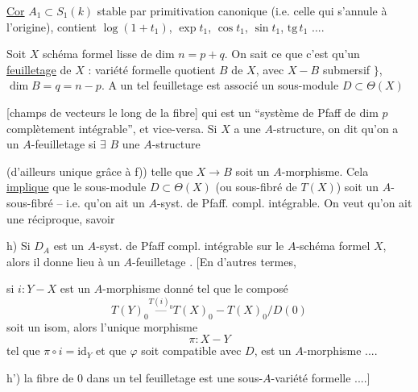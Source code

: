 \uline{Cor} $A_1\subset S_1(k)$ stable par primitivation canonique (i.e. celle qui s'annule à l'origine), contient $\log(1+t_1)$, $\exp t_1$, $\cos t_1$, $\sin t_1$, $\mathrm{tg}\,t_1$ ....

Soit $X$ schéma formel lisse de dim $n=p+q$. On sait  ce que c'est qu'un \uline{feuilletage}  de $X$ : variété formelle quotient $B$ de $X$, avec $X-B$ submersif $\}$, $\dim B=q=n-p$. A un tel feuilletage est associé un sous-module $D\subset\Theta(X)$

[champs de vecteurs le long de la fibre] qui est un ``système de Pfaff de dim $p$ complètement intégrable'', et vice-versa. Si $X$ a une $A$-structure, on dit qu'on a un $A$-feuilletage si $\exists$  $B$ une $A$-structure

(d'ailleurs unique \unsure{$\}$|)|,} grâce à f)) telle que $X\to B$ soit un $A$-morphisme. Cela \uline{implique} que le sous-module $D\subset\Theta(X)$ (ou sous-fibré de $T(X)$) soit un $A$-sous-fibré -- i.e. qu'on ait un $A$-syst. de Pfaff. compl. intégrable. On veut qu'on ait une réciproque, savoir

h) Si $D_A$ est un $A$-syst. de Pfaff compl. intégrable sur le $A$-schéma formel $X$, alors il donne lieu à un $A$-feuilletage . [En d'autres termes,


si $i:Y-X$ est un $A$-morphisme donné tel que le composé
\[
 T(Y)_0\mathrel{\overset{T(i)_0}{\text{---}}}T(X)_0-T(X)_0/D(0)
\]
soit un isom, alors l'unique morphisme
\[
 \pi:X-Y
\]
tel que $\pi\circ i=\mathrm{id}_Y$ et que $\varphi$ soit compatible avec $D$, est un $A$-morphisme ....

\margin{$\Longleftarrow$} h') la fibre de $0$ dans un tel feuilletage est une sous-$A$-variété formelle ....]
